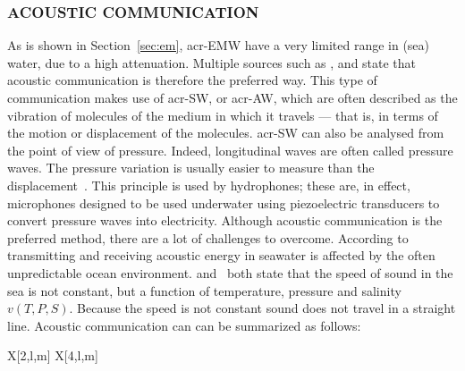 \subsubsection{ACOUSTIC COMMUNICATION}\label{sec:ac}

As is shown in Section~\ref{sec:em}, \gls{acr-EMW} have a very limited range in (sea) water, due to a high 
attenuation. Multiple sources such as \citet{hagman_elias_design_2009}, \citet{claus_design_2014} and 
\citet{domingo_overview_2012} state that acoustic communication is therefore the preferred way. This type of 
communication makes use of \gls{acr-SW}, or \gls{acr-AW}, which are often described as the vibration of molecules of 
the medium in which it travels --- that is, in terms of the motion or displacement of the molecules. \gls{acr-SW}  
can also be analysed from the point of view of pressure. Indeed, longitudinal waves are often called pressure waves. 
The pressure variation is usually easier to measure than the displacement~\cite{giancoli_physics_2015}. This 
principle is used by hydrophones; these are, in effect, microphones designed to be used underwater using 
piezoelectric transducers to convert pressure waves into electricity. Although acoustic communication is the 
preferred method, there are a lot of challenges to overcome. According to~\citet{tetley_electronic_2007} transmitting
and receiving acoustic energy in seawater is affected by the often unpredictable ocean environment. 
\citet{lanbo_prospects_2008} and~\citet{edward_tucholski_underwater_2006} both state that the speed of sound in the 
sea is not constant, but a function of temperature, pressure and salinity \( v(T, P, S) \). Because the speed is not 
constant sound does not travel in a straight line. Acoustic communication can can be summarized as follows:

\begin{RoyalTable}{X[2,l,m] X[4,l,m]}
\end{RoyalTable}
\clearpage